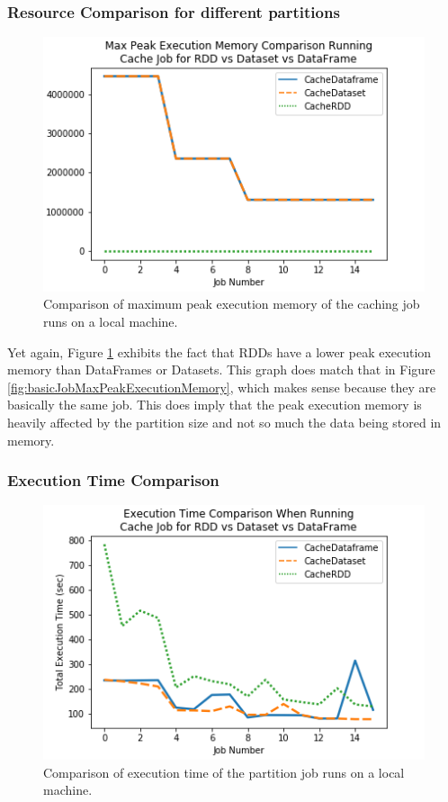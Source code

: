 \documentclass[conference]{IEEEtran}
\begin{document}
\subsubsection{Resource Comparison for different partitions}
\begin{figure}
    \includegraphics[width=\linewidth]{../python_scripts/images/cacheJobMaxPeakExecutionMemory.png}
    \caption{Comparison of maximum peak execution memory of the caching job runs on a local machine.}
    \label{fig:cacheJobMaxPeakExecutionMemory}
\end{figure}

Yet again, Figure \ref{fig:cacheJobMaxPeakExecutionMemory} exhibits the fact that RDDs have a lower peak execution memory than DataFrames or Datasets.
This graph does match that in Figure \ref{fig:basicJobMaxPeakExecutionMemory}, which makes sense because they are basically the same job.
This does imply that the peak execution memory is heavily affected by the partition size and not so much the data being stored in memory.

\subsubsection{Execution Time Comparison}
\begin{figure}
    \includegraphics[width=\linewidth]{../python_scripts/images/cacheJobAllExecutionTime.png}
    \caption{Comparison of execution time of the partition job runs on a local machine.}
    \label{fig:cacheJobAllExecutionTime}
\end{figure}
\end{document}
